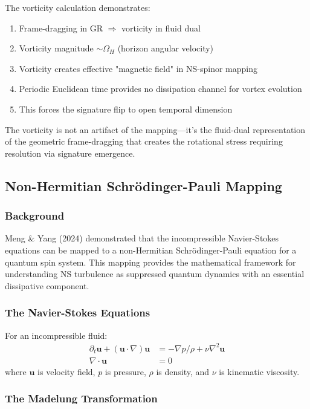 \documentclass[11pt]{article}
\begin{document}
The vorticity calculation demonstrates:
\begin{enumerate}
\item Frame-dragging in GR $\Rightarrow$ vorticity in fluid dual
\item Vorticity magnitude $\sim \Omega_H$ (horizon angular velocity)
\item Vorticity creates effective "magnetic field" in NS-spinor mapping
\item Periodic Euclidean time provides no dissipation channel for vortex evolution
\item This forces the signature flip to open temporal dimension
\end{enumerate}

The vorticity is not an artifact of the mapping—it's the fluid-dual representation of the geometric frame-dragging that creates the rotational stress requiring resolution via signature emergence.

\subsection{Non-Hermitian Schrödinger-Pauli Mapping}

\subsubsection{Background}

Meng \& Yang (2024) demonstrated that the incompressible Navier-Stokes equations can be mapped to a non-Hermitian Schrödinger-Pauli equation for a quantum spin system. This mapping provides the mathematical framework for understanding NS turbulence as suppressed quantum dynamics with an essential dissipative component.

\subsubsection{The Navier-Stokes Equations}

For an incompressible fluid:
\begin{align}
\partial_t \mathbf{u} + (\mathbf{u} \cdot \nabla)\mathbf{u} &= -\nabla p/\rho + \nu \nabla^2 \mathbf{u} \\
\nabla \cdot \mathbf{u} &= 0
\end{align}
where $\mathbf{u}$ is velocity field, $p$ is pressure, $\rho$ is density, and $\nu$ is kinematic viscosity.

\subsubsection{The Madelung Transformation}
\end{document}
